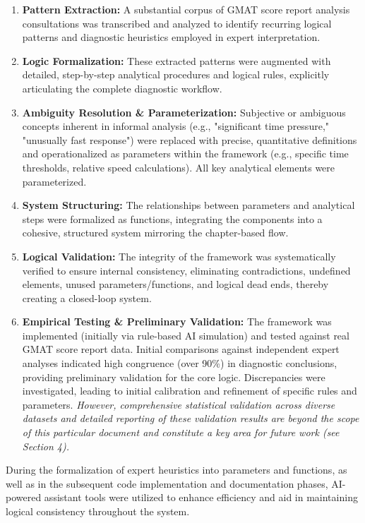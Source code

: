 \documentclass{article}
\begin{document}
\begin{enumerate}
    \item \textbf{Pattern Extraction:} A substantial corpus of GMAT score report analysis consultations was transcribed and analyzed to identify recurring logical patterns and diagnostic heuristics employed in expert interpretation.
    \item \textbf{Logic Formalization:} These extracted patterns were augmented with detailed, step-by-step analytical procedures and logical rules, explicitly articulating the complete diagnostic workflow.
    \item \textbf{Ambiguity Resolution \& Parameterization:} Subjective or ambiguous concepts inherent in informal analysis (e.g., "significant time pressure," "unusually fast response") were replaced with precise, quantitative definitions and operationalized as parameters within the framework (e.g., specific time thresholds, relative speed calculations). All key analytical elements were parameterized.
    \item \textbf{System Structuring:} The relationships between parameters and analytical steps were formalized as functions, integrating the components into a cohesive, structured system mirroring the chapter-based flow.
    \item \textbf{Logical Validation:} The integrity of the framework was systematically verified to ensure internal consistency, eliminating contradictions, undefined elements, unused parameters/functions, and logical dead ends, thereby creating a closed-loop system.
    \item \textbf{Empirical Testing \& Preliminary Validation:} The framework was implemented (initially via rule-based AI simulation) and tested against real GMAT score report data. Initial comparisons against independent expert analyses indicated high congruence (over 90\%) in diagnostic conclusions, providing preliminary validation for the core logic. Discrepancies were investigated, leading to initial calibration and refinement of specific rules and parameters. \textit{However, comprehensive statistical validation across diverse datasets and detailed reporting of these validation results are beyond the scope of this particular document and constitute a key area for future work (see Section 4).}
\end{enumerate}

During the formalization of expert heuristics into parameters and functions, as well as in the subsequent code implementation and documentation phases, AI-powered assistant tools were utilized to enhance efficiency and aid in maintaining logical consistency throughout the system.
\end{document}
